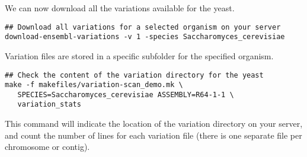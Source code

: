 We can now download all the variations available for the yeast.

\begin{lstlisting}
## Download all variations for a selected organism on your server
download-ensembl-variations -v 1 -species Saccharomyces_cerevisiae
\end{lstlisting}

Variation files are stored in a specific subfolder for the specified
organism.

\begin{lstlisting}
## Check the content of the variation directory for the yeast
make -f makefiles/variation-scan_demo.mk \
   SPECIES=Saccharomyces_cerevisiae ASSEMBLY=R64-1-1 \
   variation_stats
\end{lstlisting}

This command will indicate the location of the variation directory on
your \RSAT server, and count the number of lines for each variation
file (there is one separate file per chromosome or contig).
